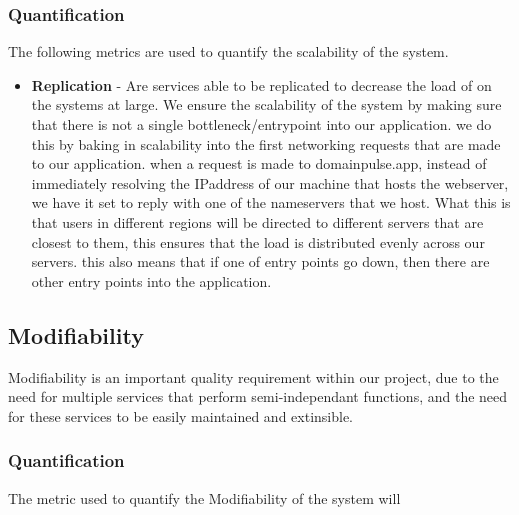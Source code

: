 \documentclass[12pt]{article}
\begin{document}
\subsubsection{Quantification}
The following metrics are used to quantify the scalability of the system.
\begin{itemize}
    \item \textbf{Replication} - Are services able to be replicated to decrease the load of on the systems at large.
          \newline We ensure the scalability of the system by making sure that there is not a single bottleneck/entrypoint into our application.
          \newline we do this by baking in scalability into the first networking requests that are made to our application. when a request is made to domainpulse.app, instead of immediately resolving the IPaddress of our machine that hosts the webserver,
          we have it set to reply with one of the nameservers that we host. What this is that users in different regions will be directed to different servers that are closest to them, this ensures that the load is distributed evenly across our servers.
          \newline this also means that if one of entry points go down, then there are other entry points into the application.
\end{itemize}

\subsection{Modifiability}
Modifiability is an important quality requirement within our project, due to the need for multiple services that perform semi-independant functions, and the need for these services to be easily maintained and extinsible.
\subsubsection{Quantification}
The metric used to quantify the Modifiability of the system will
\newpage
\end{document}

